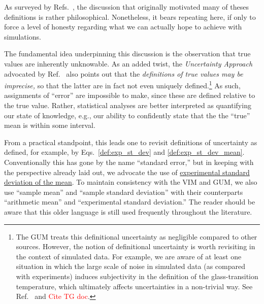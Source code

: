 As surveyed by Refs.~\citep{JCGM:GUM2008,JCGM:VIM2012}, the discussion that originally motivated many of theses definitions is rather philosophical.
Nonetheless, it bears repeating here, if only to force a level of honesty regarding what we can actually hope to achieve with simulations.

The fundamental idea underpinning this discussion is the observation that true values are inherently unknowable.
As an added twist, the {\it Uncertainty Approach} advocated by Ref.~\citep{JCGM:GUM2008} also points out that the {\it definitions of true values may be imprecise,} so that the latter are in fact not even uniquely defined.\footnote{The GUM treats this definitional uncertainty as negligible compared to other sources.
However, the notion of definitional uncertainty is worth revisiting in the context of simulated data.
For example, we are aware of at least one situation in which the large scale of noise in simulated data (as compared with experiments) induces subjectivity in the definition of the glass-transition temperature, which ultimately affects uncertainties in a non-trivial way.
See Ref.~\citep{patrone1} and \textcolor{red}{Cite TG doc}.}
As such, assignments of ``error'' are impossible to make, since these are defined relative to the true value.
Rather, statistical analyses are better interpreted as quantifying our state of knowledge, e.g., our ability to confidently state that the the ``true'' mean is within some interval.

From a practical standpoint, this leads one to revisit definitions of uncertainty as defined, for example, by Eqs.~\ref{def:exp_st_dev} and \ref{def:exp_st_dev_mean}.
Conventionally this has gone by the name ``standard error,'' but in keeping with the perspective already laid out, we advocate the use of \hyperref[def:exp_st_dev_mean]{experimental standard deviation of the mean}.
To maintain consistency with the VIM and GUM, we also use ``sample mean'' and ``sample standard deviation'' with their counterparts ``arithmetic mean'' and ``experimental standard deviation.''
The reader should be aware that this older language is still used frequently throughout the literature.




